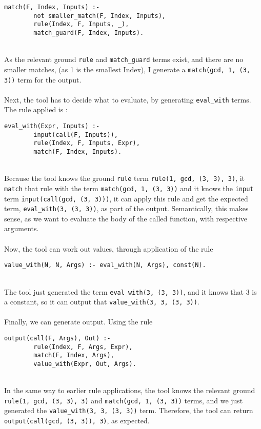 \begin{lstlisting}
match(F, Index, Inputs) :- 
		not smaller_match(F, Index, Inputs), 
		rule(Index, F, Inputs, _), 
		match_guard(F, Index, Inputs).
\end{lstlisting}
\mbox{} \\
As the relevant ground \lstinline{rule} and \lstinline{match_guard} terms exist, and there are no smaller matches, (as 1 is the smallest Index), I generate a \lstinline{match(gcd, 1, (3, 3))} term for the output. \\ \\ %
Next, the tool has to decide what to evaluate, by generating \lstinline{eval_with} terms. The rule applied is :\\ %

\begin{lstlisting}
eval_with(Expr, Inputs) :- 
		input(call(F, Inputs)), 
		rule(Index, F, Inputs, Expr), 
		match(F, Index, Inputs).
\end{lstlisting}
\mbox{} \\
Because the tool knows the ground \lstinline{rule} term \lstinline{rule(1, gcd, (3, 3), 3)}, it \lstinline{match} that rule with the term \lstinline{match(gcd, 1, (3, 3))} and it knows the \lstinline{input} term \lstinline{input(call(gcd, (3, 3)))}, it can apply this rule and get the expected term, \lstinline{eval_with(3, (3, 3))}, as part of the output. Semantically, this makes sense, as we want to evaluate the body of the called function, with respective arguments. \\ \\%
Now, the tool can work out values, through application of the rule \\

\begin{lstlisting}
value_with(N, N, Args) :- eval_with(N, Args), const(N).
\end{lstlisting}
\mbox{} \\
The tool just generated the term \lstinline{eval_with(3, (3, 3))}, and it knows that 3 is a constant, so it can output that \lstinline{value_with(3, 3, (3, 3))}. \\ \\
Finally, we can generate output. Using the rule \\

\begin{lstlisting}
output(call(F, Args), Out) :- 
		rule(Index, F, Args, Expr), 
		match(F, Index, Args), 
		value_with(Expr, Out, Args).
\end{lstlisting}
\mbox{} \\
In the same way to earlier rule applications, the tool knows the relevant ground \lstinline{rule(1, gcd, (3, 3), 3)} and \lstinline{match(gcd, 1, (3, 3))} terms, and we just generated the \lstinline{value_with(3, 3, (3, 3))} term. Therefore, the tool can return \lstinline{output(call(gcd, (3, 3)), 3)}, as expected.

